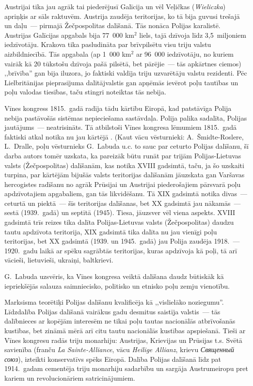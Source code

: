 \documentclass[twoside,a5paper,12pt,fleqn,openany]{extbook}
\newcommand{\pltxti}[1]{\textit{\textpolish{#1}}}
\newcommand{\rutxti}[1]{\textit{\textrussian{#1}}}
\newcommand{\detxti}[1]{\textit{\textgerman{#1}}}
\newcommand{\frtxti}[1]{\textit{\textfrench{#1}}}
\begin{document}
Austrijai tika jau agrāk tai piederējusī Galīcija un vēl Veļičkas (\pltxti{Wieliczka}) apriņķis ar sāls raktuvēm. Austrija zaudēja teritorijas, ko tā bija guvusi trešajā un daļu~--- pirmajā Žečpospolitas dalīšanā. Tās nonāca Polijas karalistē. Austrijas Galīcijas apgabals bija 77~000 km$^{2}$ liels, tajā dzīvoja līdz 3,5~miljoniem iedzīvotāju. Krakova tika pasludināta par brīvpilsētu visu triju valstu aizbildniecībā. Tās apgabala (ap 1~000 km$^{2}$ ar 96~000 iedzīvotāju, no kuriem vairāk kā 20 tūkstošu dzīvoja pašā pilsētā, bet pārējie~--- tās apkārtnes ciemos) ,,brīvība'' gan bija iluzora, jo faktiski valdīja triju uzvarētāju valstu rezidenti. Pēc Lielbritānijas pieprasījuma dalītājvalstis gan apņēmās ievērot poļu tautības un poļu valodas tiesības, taču stingri noteiktas tās nebija.

Vīnes kongress 1815.~gadā radīja tādu kārtību Eiropā, kad patstāvīga Polija nebija pastāvošās sistēmas nepieciešama sastāvdaļa. Polija palika sadalīta, Polijas jautājums~--- neatrisināts. Tā atbilstoši Vīnes kongresa lēmumiem 1815.~gadā faktiski atkal notika nu jau kārtējā . (Kaut vācu vēsturnieki: A.~Šmidte-Roslere, L.~Dralle, poļu vēsturnieks G.~Labuda u.c. to sauc par ceturto Polijas dalīšanu, šī darba autors tomēr uzskata, ka pareizāk būtu runāt par trijām Polijas-Lietuvas valsts (Žečpospolitas) dalīšanām, kas notika XVIII gadsimtā, taču, ja šo uzskaiti turpina, par kārtējām bijušās valsts teritorijas dalīšanām jāuzskata gan Varšavas hercogistes radīšanu no agrāk Prūsijai un Austrijai piederošajiem pārsvarā poļu apdzīvotajiem apgabaliem, gan tās likvidēšanu. Tā XIX gadsimtā notika divas~--- ceturtā un piektā~--- šīs teritorijas dalīšanas, bet XX gadsimtā jau nākamās~--- sestā (1939.~gadā) un septītā (1945). Tiesa, jāuzsver vēl viena aspekts. XVIII gadsimtā trīs reizes tika dalīta Polijas-Lietuvas valsts (Žečpospolitas) daudzu tautu apdzīvota teritorija, XIX gadsimtā tika dalīta nu jau vienīgi poļu teritorijas, bet XX gadsimtā (1939. un 1945.~gadā) jau Polija zaudēja 1918.~--- 1920.~gadu laikā ar spēku sagrābtās teritorijas, kuras apdzīvoja kā poļi, tā arī vācieši, lietuvieši, ukraiņi, baltkrievi.

G.~Labuda uzsvēris, ka Vīnes kongresa veiktā dalīšana daudz būtiskāk kā iepriekšējās salauza saimniecisko, politisko un etnisko poļu zemju vienotību.

Marksisma teorētiķi Polijas dalīšanu kvalificēja kā ,,vislielāko noziegumu''. Līdzdalība Polijas dalīšanā vairākus gadu desmitus saistīja valstis~--- tās dalībnieces ar kopējām interesēm ne tikai poļu tautas nacionālās atbrīvošanās kustības, bet zināmā mērā arī citu tautu nacionālās kustības apspiešanā. Tieši ar Vīnes kongresu radās triju monarhiju: Austrijas, Krievijas un Prūsijas t.s. Svētā savienība (franču \frtxti{La Sainte-Alliance}, vācu \detxti{Heilige Allianz}, krievu \rutxti{Священный союз}), izteikti konservatīvs spēks Eiropā. Dalība Polijas dalīšanā līdz pat 1914.~gadam cementēja triju monarhiju sadarbību un sargāja Austrumeiropu pret kariem un revolucionāriem satricinājumiem.
\end{document}
